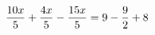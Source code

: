 \documentclass[preview]{standalone}
\begin{document}
\begin{align*}
\special{dvisvgm:raw <g id='unique000'>}\frac{10 x}{5} + \frac{4 x}{5} - \frac{15 x}{5} = 9 - \frac{9}{2} + 8\special{dvisvgm:raw </g>}
\end{align*}
\end{document}
